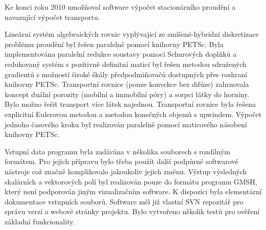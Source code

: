 \documentclass[11pt]{report}
\begin{document}
Ke konci roku 2010 umožňoval software výpočet stacionárního proudění a 
navazující výpočet transportu. 

Lineární systém algebraických rovnic vyplývající 
ze smíšené-hybridní diskretizace problému prou\-dě\-ní byl řešen paralelně pomocí 
knihovny PETSc. Byla implementována paralelní redukce soustavy pomocí 
Schurových doplňků a redukovaný systém s pozitivně definitní maticí byl řešen 
metodou sdru\-že\-ných gradientů s možností široké škály předpodmiňovačů dostupných 
přes rozhraní knihovny PETSc. Transportní rovnice (pouze konvekce bez difúze) 
zahrnovala koncept duální porozity (mobilní a immobilní póry) a sorpci látky 
do horniny. Bylo možno řešit transport více látek najednou. Transportní rovnice 
byla řešena explicitní Eulerovou metodou a metodou konečných objemů s upwindem.  
Výpočet jednoho časového kroku byl realizován paralelně pomocí maticového 
násobení knihovny PETSc. 

Vstupní data programu byla zadávána v několika 
souborech s rozdílným formátem. Pro jejich pří\-pra\-vu bylo třeba použít 
další podpůrné softwarové nástroje což značně komplikovalo jakoukoliv 
jejich změnu. Výstup výsledných skalárních a vektorových 
polí byl realizován pouze do formátu programu GMSH, který není podporován jiným 
vizualizačním software. K dispozici byla elementární dokumentace vstupních 
souborů. Software měl již vlastní SVN repozitář pro správu verzí a webové 
stránky projektu. Bylo vytvořeno několik testů pro ověření základní 
funkcionality. 
\end{document}
